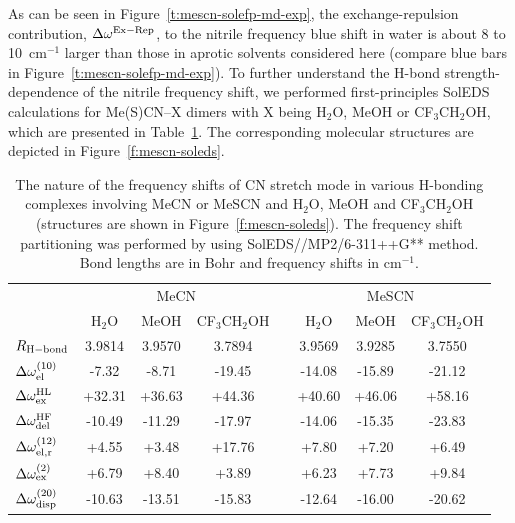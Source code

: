 \documentclass[b5paper,oneside,fleqn,11pt]{book}
\begin{document}
\begin{refsection}
As can be seen in Figure~\ref{t:mescn-solefp-md-exp}, the exchange\hyp{}repulsion
contribution, $\Delta\omega^{\rm Ex-Rep}$, to the nitrile frequency blue shift in
water is about 8 to 10~cm$^{-1}$ larger than those in aprotic
solvents considered here (compare blue bars in Figure~\ref{t:mescn-solefp-md-exp}). To
further understand the H-bond strength\hyp{}dependence of the
nitrile frequency shift, we performed first\hyp{}principles SolEDS
calculations for Me(S)CN--X dimers with X being H$_2$O, MeOH or
CF$_3$CH$_2$OH, which are presented in Table~\ref{t:mescn-soleds}. 
The corresponding molecular structures are depicted in Figure~\ref{f:mescn-soleds}. 
%
\begin{table}
\caption{
The nature of the frequency shifts of CN stretch mode in various 
H-bonding complexes involving MeCN or MeSCN and H$_2$O, MeOH 
and CF$_3$CH$_2$OH (structures are shown in Figure~\ref{f:mescn-soleds}). 
The frequency shift partitioning was performed by using 
SolEDS//MP2/6-311++G** method. Bond lengths are in Bohr and frequency shifts in
cm$^{-1}$.
\label{t:mescn-soleds}}
\begin{tabular*}{1.0\textwidth}{@{\extracolsep{\fill} } l ccc c ccc}
\hline\hline
                                 & \multicolumn{3}{c}{MeCN}            && \multicolumn{3}{c}{MeSCN}             \\
                                 & H$_2$O &    MeOH  &  CF$_3$CH$_2$OH &&  H$_2$O   &  MeOH   &  CF$_3$CH$_2$OH \\
\hline
$R_{\rm H-bond}$                 & 3.9814 &   3.9570 &  3.7894         &&  3.9569   &  3.9285 &    3.7550       \\ 
$\Delta\omega^{(10)}_{\rm el}$   & -7.32  &    -8.71 &     -19.45      &&  -14.08   &  -15.89 &    -21.12       \\
$\Delta\omega^{\rm HL}_{\rm ex}$ & +32.31 &   +36.63 &     +44.36      &&  +40.60   &  +46.06 &    +58.16       \\
$\Delta\omega^{\rm HF}_{\rm del}$& -10.49 &   -11.29 &     -17.97      &&  -14.06   &  -15.35 &    -23.83       \\
$\Delta\omega^{(12)}_{\rm el,r}$ &  +4.55 &    +3.48 &     +17.76      &&   +7.80   &   +7.20 &     +6.49       \\
$\Delta\omega^{(2)}_{\rm ex}$    &  +6.79 &    +8.40 &      +3.89      &&   +6.23   &   +7.73 &     +9.84       \\
$\Delta\omega^{(20)}_{\rm disp}$ & -10.63 &   -13.51 &     -15.83      &&  -12.64   &  -16.00 &    -20.62       \\

\end{tabular*}
\end{table}
\end{refsection}
\end{document}
